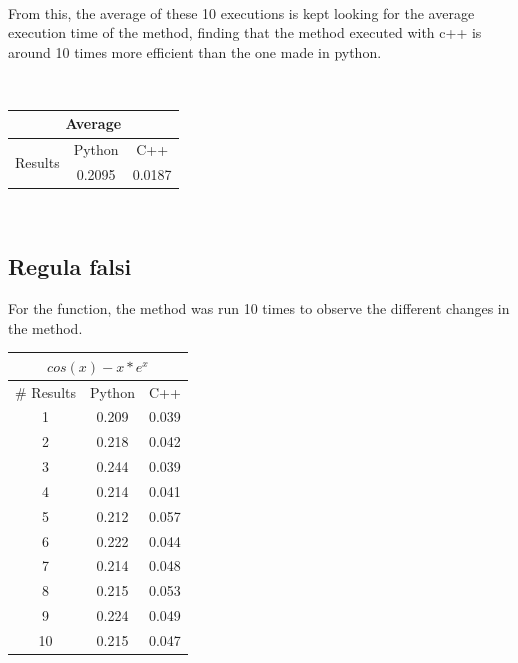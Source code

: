 \documentclass[conference]{IEEEtran}
\begin{document}
\ 


From this, the average of these 10 executions is kept looking for the average execution time of the method, finding that the method executed with c++ is around 10 times more efficient than the one made in python.

\



\begin{tabular}{|c|c|c|}
\hline
\multicolumn{3}{|c|}{Average}              \\ \hline
\multirow{2}{*}{Results} & Python & C++    \\ \cline{2-3} 
                         & 0.2095 & 0.0187 \\ \hline
\end{tabular}




\ 


\subsection{Regula falsi}

For the function, the method was run 10 times to observe the different changes in the method.


\begin{tabular}{|c|c|c|}
\hline
\multicolumn{3}{|c|}{\(cos(x)  -  x * e^x\)} \\ \hline
\# Results               & Python              & C++                \\ \hline
1                        & 0.209               & 0.039              \\ \hline
2                        & 0.218               & 0.042              \\ \hline
3                        & 0.244               & 0.039              \\ \hline
4                        & 0.214               & 0.041              \\ \hline
5                        & 0.212               & 0.057              \\ \hline
6                        & 0.222               & 0.044              \\ \hline
7                        & 0.214               & 0.048              \\ \hline
8                        & 0.215               & 0.053              \\ \hline
9                        & 0.224               & 0.049              \\ \hline
10                       & 0.215               & 0.047              \\ \hline
\end{tabular}
\end{document}
